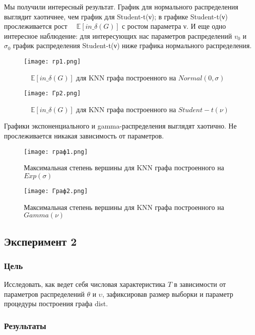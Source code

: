 \documentclass[a4paper, 12pt]{article}
\begin{document}
Мы получили интересный результат. График для нормального распределения выглядит хаотичнее, чем график для Student-t(ν); в графике Student-t(ν) прослеживается рост $\quad \mathbb{E}[in\_\delta(G)]$ с ростом параметра ν. И еще одно интересное наблюдение: для интересующих нас параметров распределений $v_0$ и $σ_0$ график распределения Student-t(ν) ниже графика нормального распределения.\\

\begin{figure}[H]
    \centering
    \texttt{[image: гр1.png]}
    \caption{$\quad \mathbb{E}[in\_\delta(G)]$ для KNN графа построенного на $Normal(0,\sigma)$}
    \label{fig:uml}
\end{figure}

\begin{figure}[H]
    \centering
    \texttt{[image: Гр2.png]}
    \caption{$\quad \mathbb{E}[in\_\delta(G)]$ для KNN графа построенного на $Student-t(ν)$}
    \label{fig:uml}
\end{figure}

Графики экспоненциального и gamma-распределения выглядят хаотично. Не прослеживается никакая зависимость от параметров.

\begin{figure}[H]
    \centering
    \texttt{[image: граф1.png]}
    \caption{Максимальная степень вершины для KNN графа построенного на $Exp(\sigma)$}
    \label{fig:uml}
\end{figure}

\begin{figure}[H]
    \centering
    \texttt{[image: Граф2.png]}
    \caption{Максимальная степень вершины для KNN графа построенного на $Gamma(ν)$}
    \label{fig:uml}
\end{figure}

\subsection{Эксперимент 2}
\subsubsection{Цель}
Исследовать, как ведет себя числовая характеристика $T$ в зависимости
от параметров распределений $θ$ и $υ$, зафиксировав размер выборки и
параметр процедуры построения графа dist.\\

\subsubsection{Результаты}
\end{document}
